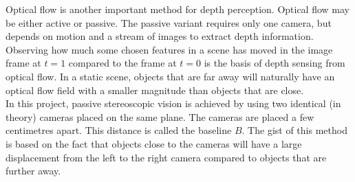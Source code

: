 Optical flow is another important method for depth perception. Optical flow may be either active or passive. The passive variant requires  only one camera, but depends on motion and a stream of images to extract depth information. Observing how much some chosen features in a scene has moved in the image frame at $t = 1$ compared to the frame at $t = 0$ is the basis of depth sensing from optical flow. In a static scene, objects that are far away will naturally have an optical flow field with a smaller magnitude than objects that are close. \\

In this project, passive stereoscopic vision is achieved by using two identical (in theory) cameras placed on the same plane. The cameras are placed a few centimetres apart. This distance is called the baseline $B$. The gist of this method is based on the fact that objects close to the cameras will have a large displacement from the left to the right camera compared to objects that are further away. 
